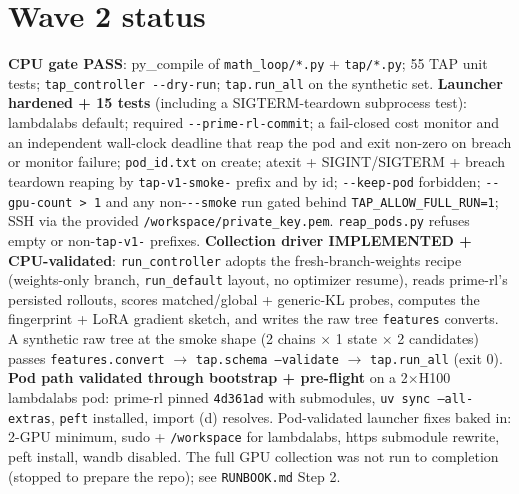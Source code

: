 \documentclass[11pt]{article}
\begin{document}
\section{Wave 2 status}\label{sec:wave2}
\textbf{CPU gate PASS}: py\_compile of \texttt{math\_loop/*.py} + \texttt{tap/*.py};
55 TAP unit tests; \texttt{tap\_controller -{}-dry-run}; \texttt{tap.run\_all} on the
synthetic set. \textbf{Launcher hardened + 15 tests} (including a SIGTERM-teardown
subprocess test): lambdalabs default; required \texttt{-{}-prime-rl-commit}; a
fail-closed cost monitor and an independent wall-clock deadline that reap the pod
and exit non-zero on breach or monitor failure; \texttt{pod\_id.txt} on create;
atexit + SIGINT/SIGTERM + breach teardown reaping by \texttt{tap-v1-smoke-} prefix
and by id; \texttt{-{}-keep-pod} forbidden; \texttt{-{}-gpu-count > 1} and any
non-\texttt{-{}-smoke} run gated behind \texttt{TAP\_ALLOW\_FULL\_RUN=1}; SSH via the
provided \texttt{/workspace/private\_key.pem}. \texttt{reap\_pods.py} refuses empty
or non-\texttt{tap-v1-} prefixes. \textbf{Collection driver IMPLEMENTED +
CPU-validated}: \texttt{run\_controller} adopts the fresh-branch-weights recipe
(weights-only branch, \texttt{run\_default} layout, no optimizer resume), reads
prime-rl's persisted rollouts, scores matched/global + generic-KL probes, computes
the fingerprint + LoRA gradient sketch, and writes the raw tree \texttt{features}
converts. A synthetic raw tree at the smoke shape (2 chains $\times$ 1 state $\times$
2 candidates) passes \texttt{features.convert} $\to$ \texttt{tap.schema --validate}
$\to$ \texttt{tap.run\_all} (exit 0). \textbf{Pod path validated through bootstrap +
pre-flight} on a 2$\times$H100 lambdalabs pod: prime-rl pinned \texttt{4d361ad} with
submodules, \texttt{uv sync --all-extras}, \texttt{peft} installed, import (d)
resolves. Pod-validated launcher fixes baked in: 2-GPU minimum, sudo +
\texttt{/workspace} for lambdalabs, https submodule rewrite, peft install, wandb
disabled. The full GPU collection was not run to completion (stopped to prepare the
repo); see \texttt{RUNBOOK.md} Step 2.
\end{document}
